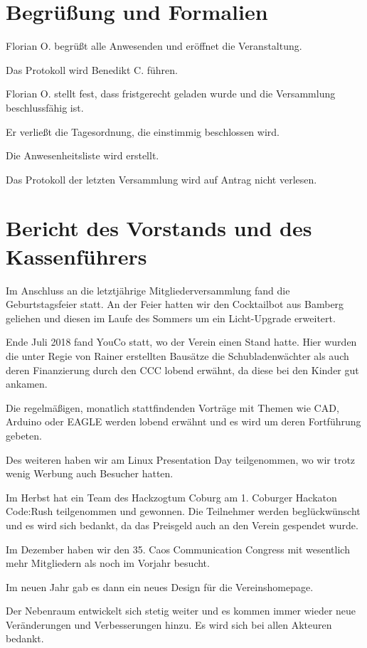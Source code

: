 \section{Begrüßung und Formalien}
Florian O. begrüßt alle Anwesenden und eröffnet die Veranstaltung. 

Das Protokoll wird Benedikt C. führen.

Florian O. stellt fest, dass fristgerecht geladen wurde und die Versammlung beschlussfähig ist. 

Er verließt die Tagesordnung, die einstimmig beschlossen wird.

Die Anwesenheitsliste wird erstellt.

Das Protokoll der letzten Versammlung wird auf Antrag nicht verlesen. 


\section{Bericht des Vorstands und des Kassenführers}
Im Anschluss an die letztjährige Mitgliederversammlung fand die Geburtstagsfeier statt.
An der Feier hatten wir den Cocktailbot aus Bamberg geliehen und diesen im Laufe des Sommers um ein Licht-Upgrade erweitert.

Ende Juli 2018 fand YouCo statt, wo der Verein einen Stand hatte. Hier wurden die unter Regie von Rainer erstellten Bausätze die Schubladenwächter als auch deren Finanzierung durch den CCC lobend erwähnt, da diese bei den Kinder gut ankamen.

Die regelmäßigen, monatlich stattfindenden Vorträge mit Themen wie CAD, Arduino oder EAGLE werden lobend erwähnt und es wird um deren Fortführung gebeten.

Des weiteren haben wir am Linux Presentation Day teilgenommen, wo wir trotz wenig Werbung auch Besucher hatten.

Im Herbst hat ein Team des Hackzogtum Coburg am 1. Coburger Hackaton Code:Rush teilgenommen und gewonnen. Die Teilnehmer werden beglückwünscht und es wird sich bedankt, da das Preisgeld auch an den Verein gespendet wurde.

Im Dezember haben wir den 35. Caos Communication Congress mit wesentlich mehr Mitgliedern als noch im Vorjahr besucht.

Im neuen Jahr gab es dann ein neues Design für die Vereinshomepage.

Der Nebenraum entwickelt sich stetig weiter und es kommen immer wieder neue Veränderungen und Verbesserungen hinzu. Es wird sich bei allen Akteuren bedankt.

